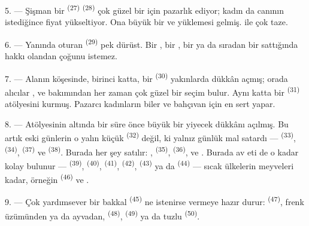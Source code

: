 5. --- Şişman bir  \textsuperscript{(27)}  \textsuperscript{(28)} çok güzel bir  için
pazarlık ediyor; kadın da canının istediğince fiyat yükseltiyor. Ona büyük bir
 ve  yüklemesi
gelmiş.  ile  çok taze.

\VUsaut{4.0mm}
\VUsaut{3.0mm}

6. --- Yanında oturan  \textsuperscript{(29)} pek
dürüst. Bir , bir , bir  ya da
sıradan bir  sattığında hakkı olandan çoğunu istemez.

7. --- Alanın köşesinde, birinci katta, bir 
\textsuperscript{(30)} yakınlarda dükkân açmış; orada alıcılar
,  ve  bakımından her
zaman çok güzel bir seçim bulur. Aynı katta bir 
\textsuperscript{(31)} atölyesini kurmuş. Pazarcı kadınların
 biler ve bahçıvan için en sert 
 yapar.

\VUsaut{4.0mm}
\VUsaut{3.0mm}

8. --- Atölyesinin altında bir süre önce büyük bir yiyecek dükkânı açılmış.
Bu artık eski günlerin o yalın küçük 
\textsuperscript{(32)} değil, ki yalnız günlük mal satardı ---
 \textsuperscript{(33)},  \textsuperscript{(34)},
 \textsuperscript{(37)} ve 
\textsuperscript{(38)}. Burada her şey satılır: ,
 \textsuperscript{(35)}, 
\textsuperscript{(36)},  ve
. Burada av eti de o kadar kolay bulunur ---
 \textsuperscript{(39)}, 
\textsuperscript{(40)},  \textsuperscript{(41)},
 \textsuperscript{(42)}, 
\textsuperscript{(43)} ya da  \textsuperscript{(44)} --- sıcak
ülkelerin meyveleri kadar, örneğin  \textsuperscript{(46)} ve
.

9. --- Çok yardımsever bir bakkal  \textsuperscript{(45)} ne
istenirse vermeye hazır durur:  \textsuperscript{(47)}, frenk
üzümünden ya da ayvadan,  \textsuperscript{(48)},
 \textsuperscript{(49)} ya da tuzlu 
\textsuperscript{(50)}.

